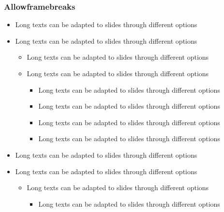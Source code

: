 \documentclass[usepdftitle=false,professionalfonts,compress ]{beamer}
\begin{document}
{
\begin{frame}[allowframebreaks]\frametitle{Allowframebreaks}


	\begin{itemize}

	\item Long texts can be adapted to slides through different options

			\item Long texts can be adapted to slides through different options


	\begin{itemize}

	\item Long texts can be adapted to slides through different options

			\item Long texts can be adapted to slides through different options


	\begin{itemize}

	\item Long texts can be adapted to slides through different options

			\item Long texts can be adapted to slides through different options

			\item Long texts can be adapted to slides through different options

			\item Long texts can be adapted to slides through different options

				\end{itemize}

				\end{itemize}

			\item Long texts can be adapted to slides through different options

			\item Long texts can be adapted to slides through different options


	\begin{itemize}

	\item Long texts can be adapted to slides through different options


	\begin{itemize}

	\item Long texts can be adapted to slides through different options


\end{itemize}
\end{itemize}
\end{itemize}
\end{frame}}
\end{document}
